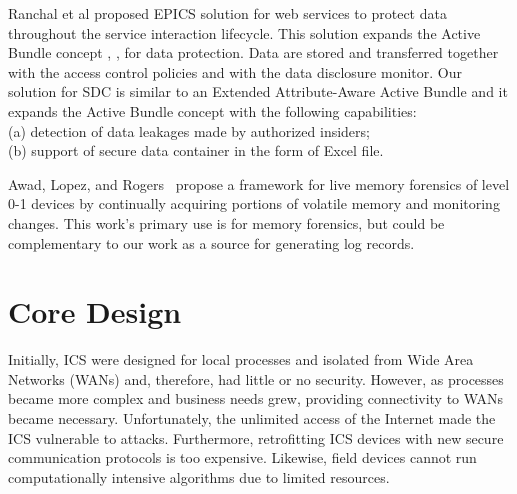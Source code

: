 \documentclass[conference]{IEEEtran}
\begin{document}
Ranchal et al \cite{c10} proposed EPICS solution for web services to protect data throughout the service interaction lifecycle. This solution expands the Active Bundle concept \cite{c12}, \cite{c13}, \cite{c14} for data protection. Data are stored and transferred together with the access control policies and with the data disclosure monitor. Our solution for SDC is similar to an Extended Attribute-Aware Active Bundle \cite{c6} and it expands the Active Bundle concept with the following capabilities: \\
(a) detection of data leakages made by authorized insiders; \\
(b) support of secure data container in the form of Excel file.  

Awad, Lopez, and Rogers~\cite{c8} propose a framework for live memory forensics of level 0-1 devices by continually acquiring portions of volatile memory and monitoring changes.  This work's primary use is for memory forensics, but could be complementary to our work as a source for generating log records.
                                                                            
\section{Core Design}
Initially, ICS were designed for local processes and isolated from Wide Area Networks (WANs) and, therefore, had little or no security. However, as processes became more complex and business needs grew, providing connectivity to WANs became necessary. 
Unfortunately, the unlimited access of the Internet made the ICS vulnerable to attacks. Furthermore, retrofitting ICS devices with new secure communication protocols is too expensive. Likewise, field devices cannot run computationally intensive algorithms due to limited resources. 
\end{document}
